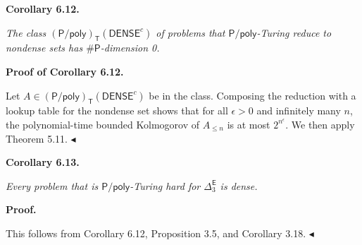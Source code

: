 \documentclass[10pt,a4paper]{article}
\begin{document}


\par\medskip\noindent\textbf{
\textbf{Corollary 6.12}\textbf{.}
}\par



\emph{The class $({\mathsf{P}/\mathsf{poly}})_{\mathsf{T}}(\mathsf{DENSE}^{c})$ of problems that ${\mathsf{P}/\mathsf{poly}}$-Turing reduce to nondense sets has ${\mathsf{\#}\mathsf{P}}$-dimension 0.}\par






\par\medskip\noindent\textbf{Proof of Corollary 6.12.}\par




Let $A\in({\mathsf{P}/\mathsf{poly}})_{\mathsf{T}}(\mathsf{DENSE}^{c})$ be in the class.
Composing the reduction with a lookup table for the nondense set shows that for all $\epsilon>0$ and infinitely many $n$, the polynomial-time bounded Kolmogorov of $A_{\leq n}$ is at most $2^{n^{\epsilon}}$. We then apply Theorem 5.11.
$\blacktriangleleft$\par





\par\medskip\noindent\textbf{
\textbf{Corollary 6.13}\textbf{.}
}\par



\emph{Every problem that is ${\mathsf{P}/\mathsf{poly}}$-Turing hard for $\Delta^{\mathsf{E}}_{3}$ is dense.}\par







\par\medskip\noindent\textbf{Proof.}\par




This follows from
Corollary 6.12,
Proposition 3.5, and
Corollary 3.18.
$\blacktriangleleft$\par
\end{document}
